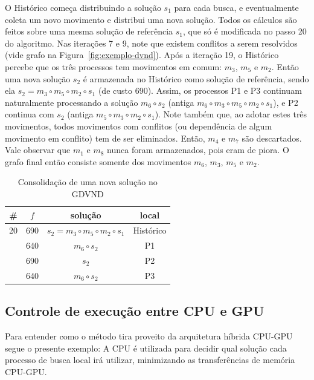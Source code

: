 O Histórico começa distribuindo a solução $s_1$ para cada busca, e eventualmente coleta um novo movimento e distribui uma nova solução.
Todos os cálculos são feitos sobre uma mesma solução de referência $s_1$, que só é modificada no passo 20 do algoritmo.
Nas iterações 7 e 9, note que existem conflitos a serem resolvidos (vide grafo na Figura~\ref{fig:exemplo-dvnd}).
Após a iteração 19, o Histórico percebe que os três processos tem movimentos em comum: $m_3$, $m_5$ e $m_2$. Então uma nova solução $s_2$ é armazenada no Histórico como solução de referência, sendo ela $s_2 = m_3 \circ m_5 \circ m_2 \circ s_1$ (de custo 690).
Assim, os processos P1 e P3 continuam naturalmente processando a solução $m_6 \circ s_2$ (antiga $m_6 \circ m_3 \circ m_5 \circ m_2 \circ s_1$), e P2 continua com $s_2$ (antiga $m_5 \circ m_3 \circ m_2 \circ s_1$).
Note também que, ao adotar estes três movimentos, todos movimentos com conflitos (ou dependência de algum movimento em conflito) tem de ser eliminados. Então, $m_4$ e $m_7$ são descartados.
Vale observar que $m_1$ e $m_8$ nunca foram armazenados, pois eram de piora.
O grafo final então consiste somente dos movimentos $m_6$, $m_3$, $m_5$ e $m_2$.


\begin{table}[htpb]
\centering
\caption{Consolidação de uma nova solução no GDVND}
\begin{tabular}{|c|ccc|}
\hline
\# & $f$ & solução & local\\\hline
20 & 690 & $s_2 = m_3 \circ m_5 \circ m_2 \circ s_1$ &  Histórico\\
   & 640 & $m_6 \circ s_2$ & P1\\
   & 690 & $s_2$           & P2\\
   & 640 & $m_6 \circ s_2$ & P3\\\hline
\end{tabular}
\end{table}

\subsection{Controle de execução entre CPU e GPU}

Para entender como o método tira proveito da arquitetura híbrida CPU-GPU segue o presente exemplo:
A CPU é utilizada para decidir qual solução cada processo de busca local irá utilizar, minimizando as transferências de memória CPU-GPU. %

